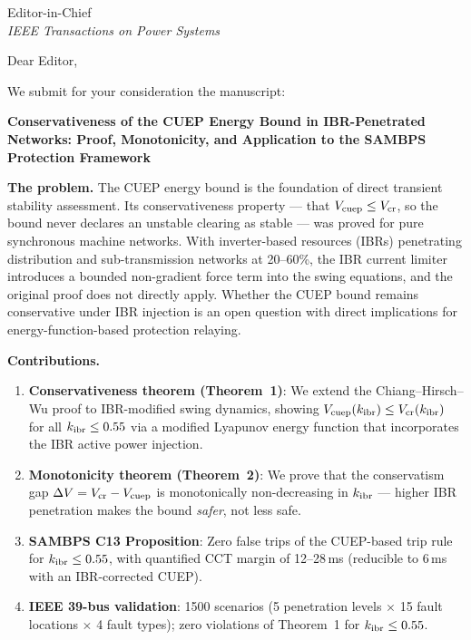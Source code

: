 \documentclass[11pt,a4paper]{letter}
\begin{document}
\begin{letter}{Editor-in-Chief\\
               \textit{IEEE Transactions on Power Systems}}

\opening{Dear Editor,}

We submit for your consideration the manuscript:

\begin{center}
  \textbf{Conservativeness of the CUEP Energy Bound in IBR-Penetrated
  Networks: Proof, Monotonicity, and Application to the SAMBPS
  Protection Framework}
\end{center}

\textbf{The problem.}
The CUEP energy bound is the foundation of direct transient stability
assessment.  Its conservativeness property --- that $V_{\rm cuep} \leq
V_{\rm cr}$, so the bound never declares an unstable clearing as stable
--- was proved for pure synchronous machine networks.  With inverter-based
resources (IBRs) penetrating distribution and sub-transmission networks
at 20--60\%, the IBR current limiter introduces a bounded non-gradient
force term into the swing equations, and the original proof does not
directly apply.  Whether the CUEP bound remains conservative under IBR
injection is an open question with direct implications for energy-function-based
protection relaying.

\textbf{Contributions.}
\begin{enumerate}
  \item \textbf{Conservativeness theorem (Theorem~1)}: We extend the
        Chiang--Hirsch--Wu proof to IBR-modified swing dynamics, showing
        $V_{\rm cuep}(k_{\rm ibr}) \leq V_{\rm cr}(k_{\rm ibr})$ for all $k_{\rm ibr} \leq 0.55$
        via a modified Lyapunov energy function that incorporates the
        IBR active power injection.

  \item \textbf{Monotonicity theorem (Theorem~2)}: We prove that the
        conservatism gap $\Delta V = V_{\rm cr} - V_{\rm cuep}$ is
        monotonically non-decreasing in $k_{\rm ibr}$ --- higher IBR penetration
        makes the bound \emph{safer}, not less safe.

  \item \textbf{SAMBPS C13 Proposition}: Zero false trips of the
        CUEP-based trip rule for $k_{\rm ibr} \leq 0.55$, with quantified
        CCT margin of 12--28\,ms (reducible to 6\,ms with an
        IBR-corrected CUEP).

  \item \textbf{IEEE 39-bus validation}: 1500 scenarios (5 penetration
        levels $\times$ 15 fault locations $\times$ 4 fault types);
        zero violations of Theorem~1 for $k_{\rm ibr} \leq 0.55$.
\end{enumerate}


\end{letter}
\end{document}

